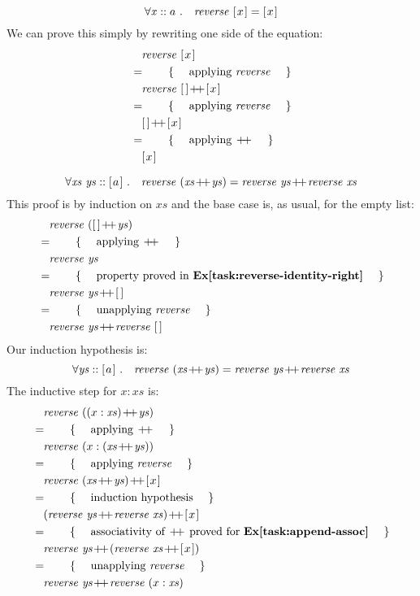 \begin{displaymath}
\forall \mathit{x} :: a~. \quad \mathit{reverse}~[\mskip1.5mu x \mskip1.5mu] = [\mskip1.5mu x \mskip1.5mu]
\end{displaymath}
We can prove this simply by rewriting one side of the equation:
\begin{align*}
\expr{\mathit{reverse}~\hslist{x}}
\hint{applying $\mathit{reverse}$}
\expr{\mathit{reverse}~\hslist{} \append \hslist{x}}
\hint{applying $\mathit{reverse}$}
\expr{\hslist{} \append \hslist{x}}
\hint{applying $\append$}
\lastexpr{\hslist{x}}
\end{align*}

\begin{displaymath}
\forall \mathit{xs}~\mathit{ys} :: \hslist{a}~. \quad \mathit{reverse}~(\mathit{xs} \append \mathit{ys}) = \mathit{reverse}~\mathit{ys} \append \mathit{reverse}~\mathit{xs}
\end{displaymath}
This proof is by induction on $\mathit{xs}$ and the base case is, as usual, for the empty list:
\begin{align*}
\expr{\mathit{reverse}~(\hslist{} \append \mathit{ys})}
\hint{applying $\append$}
\expr{\mathit{reverse}~\mathit{ys}}
\hint{property proved in \textbf{Ex\ref{task:reverse-identity-right}}}
\expr{\mathit{reverse}~\mathit{ys} \append \hslist{}}
\hint{unapplying $\mathit{reverse}$}
\lastexpr{\mathit{reverse}~\mathit{ys} \append \mathit{reverse}~\hslist{}}
\end{align*}
Our induction hypothesis is:
\begin{displaymath}
\forall \mathit{ys} :: \hslist{a}~. \quad \mathit{reverse}~(\mathit{xs} \append \mathit{ys}) = \mathit{reverse}~\mathit{ys} \append \mathit{reverse}~\mathit{xs}
\end{displaymath}
The inductive step for $x:\mathit{xs}$ is:
\begin{align*}
\expr{\mathit{reverse}~((x:\mathit{xs}) \append \mathit{ys})}
\hint{applying $\append$}
\expr{\mathit{reverse}~(x:(\mathit{xs} \append \mathit{ys}))}
\hint{applying $\mathit{reverse}$}
\expr{\mathit{reverse}~(\mathit{xs} \append \mathit{ys}) \append \hslist{x}}
\hint{induction hypothesis}
\expr{(\mathit{reverse}~\mathit{ys} \append \mathit{reverse}~\mathit{xs}) \append \hslist{x}}
\hint{associativity of $\append$ proved for \textbf{Ex\ref{task:append-assoc}}}
\expr{\mathit{reverse}~\mathit{ys} \append (\mathit{reverse}~\mathit{xs} \append \hslist{x})}
\hint{unapplying $\mathit{reverse}$}
\lastexpr{\mathit{reverse}~\mathit{ys} \append \mathit{reverse}~(x:\mathit{xs})}
\end{align*}

